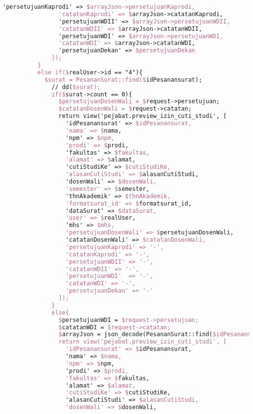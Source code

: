 \begin{lstlisting}[language=tex,basicstyle=\tiny,caption=PesanansuratController.php]
                'persetujuanKaprodi' => $arrayJson->persetujuanKaprodi,
                'catatanKaprodi' => $arrayJson->catatanKaprodi,
                'persetujuanWDII' => $arrayJson->persetujuanWDII,
                'catatanWDII' => $arrayJson->catatanWDII,
                'persetujuanWDI' => $arrayJson->persetujuanWDI,
                'catatanWDI' => $arrayJson->catatanWDI,
                'persetujuanDekan' => $persetujuanDekan
              ]);
          }
          else if($realUser->id == "4"){
            $surat = PesananSurat::find($idPesanansurat);
              // dd($surat);
              if($surat->count == 0){
                $persetujuanDosenWali = $request->persetujuan;
                $catatanDosenWali = $request->catatan;
                return view('pejabat.preview_izin_cuti_studi', [
                  'idPesanansurat' => $idPesanansurat,
                  'nama' => $nama,
                  'npm' => $npm,
                  'prodi' => $prodi,
                  'fakultas' => $fakultas,
                  'alamat' => $alamat,
                  'cutiStudiKe' => $cutiStudiKe,
                  'alasanCutiStudi' => $alasanCutiStudi,
                  'dosenWali' => $dosenWali,
                  'semester' => $semester,
                  'thnAkademik' => $thnAkademik,
                  'formatsurat_id' => $formatsurat_id,
                  'dataSurat' => $dataSurat,
                  'user' => $realUser,
                  'mhs' => $mhs,
                  'persetujuanDosenWali' => $persetujuanDosenWali,
                  'catatanDosenWali' => $catatanDosenWali,
                  'persetujuanKaprodi' => '-',
                  'catatanKaprodi' => '-',
                  'persetujuanWDII' => '-',
                  'catatanWDII' => '-',
                  'persetujuanWDI'  => '-',
                  'catatanWDI' => '-',
                  'persetujuanDekan' => '-'
                ]);
              }
              else{
                $persetujuanWDI = $request->persetujuan;
                $catatanWDI = $request->catatan;
                $arrayJson = json_decode(PesananSurat::find($idPesanansurat)->dataSurat);
                return view('pejabat.preview_izin_cuti_studi', [
                  'idPesanansurat' => $idPesanansurat,
                  'nama' => $nama,
                  'npm' => $npm,
                  'prodi' => $prodi,
                  'fakultas' => $fakultas,
                  'alamat' => $alamat,
                  'cutiStudiKe' => $cutiStudiKe,
                  'alasanCutiStudi' => $alasanCutiStudi,
                  'dosenWali' => $dosenWali,

\end{lstlisting}
